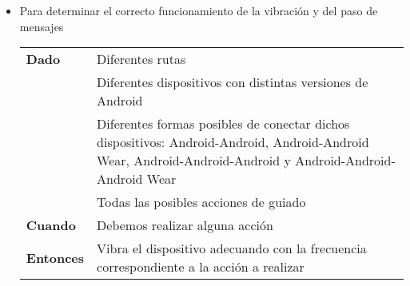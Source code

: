\begin{itemize}
  \item Para determinar el correcto funcionamiento de la vibración y del paso de mensajes

  \begin{tabular}{p{}p{}}
    \hline
    \textbf{Dado}     & Diferentes rutas \\
                      & Diferentes dispositivos con distintas versiones de Android \\
                      & Diferentes formas posibles de conectar dichos dispositivos:
                        Android-Android, Android-Android Wear, Android-Android-Android y 
                        Android-Android-Android Wear \\
                      & Todas las posibles acciones de guiado \\
    \textbf{Cuando}   & Debemos realizar alguna acción \\
    \textbf{Entonces} & Vibra el dispositivo adecuando con la frecuencia correspondiente a
                        la acción a realizar \\
    \hline
  \end{tabular}
\end{itemize}

